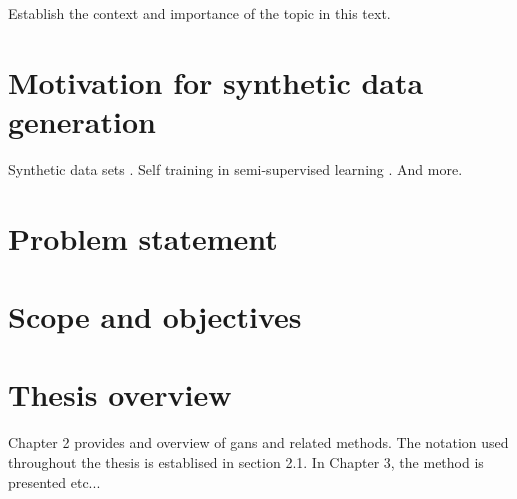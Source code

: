 Establish the context and importance of the topic in this text.

\section{Motivation for synthetic data generation}
Synthetic data sets \textcite{patki2016synthetic}. Self training in semi-supervised learning \cite{wuliu2017selftrainsemisup}. And more.

\section{Problem statement}

\section{Scope and objectives}

\section{Thesis overview}
Chapter 2 provides and overview of \acrlong{gans} and related methods. The notation used throughout the thesis is establised in section 2.1. In Chapter 3, the method is presented etc...



